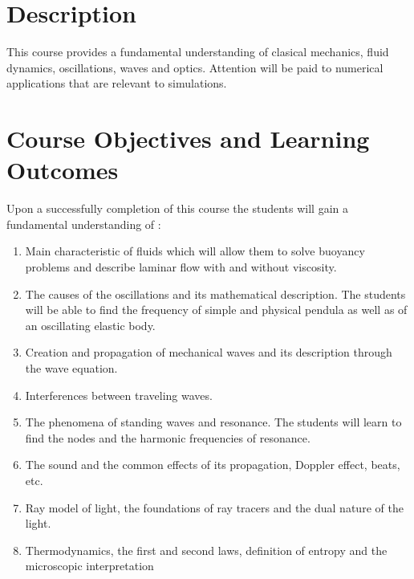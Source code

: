 \documentclass[12pt]{article}
\begin{document}



\section*{Description}

This  course provides a fundamental understanding of 
clasical mechanics, fluid dynamics, oscillations, waves and optics. 
Attention will be paid to numerical applications that are relevant to simulations.  




\section*{Course Objectives and Learning Outcomes }
Upon a successfully completion of this course the students will gain a fundamental understanding of :

\begin{enumerate}
\item  Main characteristic of fluids which will allow them to solve buoyancy problems and describe laminar flow with and without viscosity.
\item  The causes of the oscillations and its mathematical description. The students will be able to find the frequency of simple and physical pendula 
as well as of an oscillating elastic body.
\item  Creation and propagation of mechanical waves and its description through the wave equation.
\item  Interferences between traveling waves. 
\item  The phenomena of standing waves and resonance. The students will learn to find the nodes and the harmonic frequencies of resonance. 
\item The sound and the common effects of its propagation, Doppler effect, beats, etc.
\item  Ray model of light, the foundations of ray tracers and the dual nature of the light.
\item Thermodynamics, the first and second laws, definition of entropy and the microscopic interpretation
\end{enumerate}
\end{document}
